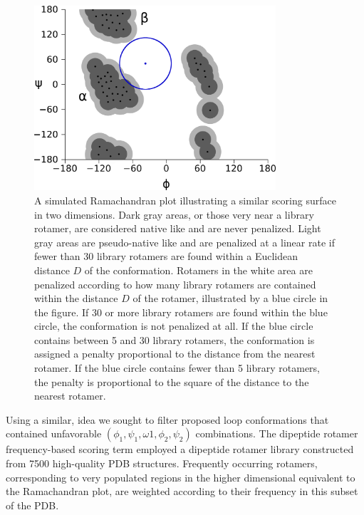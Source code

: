 \begin{figure}[h]
    \centering
    \includegraphics[width=0.8\textwidth,height=0.5\textheight,keepaspectratio]{figures/rfs_ex.png}
    \caption{A simulated Ramachandran plot illustrating a similar scoring surface in two dimensions.
Dark gray areas, or those very near a library rotamer, are considered native like and are never penalized.
Light gray areas are pseudo-native like and are penalized at a linear rate if fewer than 30 library rotamers are found within a Euclidean distance $D$ of the conformation.
Rotamers in the white area are penalized according to how many library rotamers are contained within the distance $D$ of the rotamer, illustrated by a blue circle in the figure.
If 30 or more library rotamers are found within the blue circle, the conformation is not penalized at all.
If the blue circle contains between 5 and 30 library rotamers, the conformation is assigned a penalty proportional to the distance from the nearest rotamer.
If the blue circle contains fewer than 5 library rotamers, the penalty is proportional to the square of the distance to the nearest rotamer.}
    \label{figure:rfs_plot}
\end{figure}

Using a similar, idea we sought to filter proposed loop conformations that contained unfavorable $(\phi_{1}, \psi_{1}, \omega{1}, \phi_{2}, \psi_{2})$ combinations.
The dipeptide rotamer frequency-based scoring term employed a dipeptide rotamer library constructed from {\textapprox}7500 high-quality PDB structures.
Frequently occurring rotamers, corresponding to very populated regions in the higher dimensional equivalent to the Ramachandran plot, are weighted according to their frequency in this subset of the PDB.

